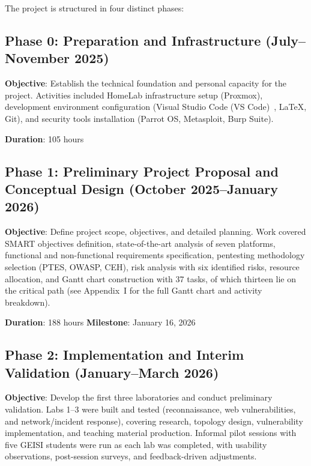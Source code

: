 The project is structured in four distinct phases:

\subsection{Phase 0: Preparation and Infrastructure (July--November 2025)}

\textbf{Objective}: Establish the technical foundation and personal capacity for the project.
Activities included HomeLab infrastructure setup (Proxmox\cite{proxmox}), development
environment configuration (Visual Studio Code (VS Code)~\cite{vscode}, LaTeX\cite{latex_project}, Git), and security tools
installation (Parrot OS\cite{parrot_os}, Metasploit\cite{metasploit}, Burp Suite\cite{burp_suite}).

\textbf{Duration}: 105 hours

\subsection{Phase 1: Preliminary Project Proposal and Conceptual Design (October 2025--January 2026)}

\textbf{Objective}: Define project scope, objectives, and detailed planning.
Work covered SMART objectives definition, state-of-the-art analysis of seven platforms,
functional and non-functional requirements specification, pentesting methodology selection
(PTES\cite{ptes}, OWASP\cite{owasp_testing_guide}, CEH\cite{ceh_framework}), risk analysis
with six identified risks, resource allocation, and Gantt chart construction with 37 tasks, of which thirteen lie on the critical path
(see Appendix~I for the full Gantt chart and activity breakdown).

\textbf{Duration}: 188 hours \quad \textbf{Milestone}: January 16, 2026

\subsection{Phase 2: Implementation and Interim Validation (January--March 2026)}

\textbf{Objective}: Develop the first three laboratories and conduct preliminary validation.
Labs 1--3 were built and tested (reconnaissance, web vulnerabilities, and network/incident
response), covering research, topology design, vulnerability implementation, and teaching
material production. Informal pilot sessions with five GEISI students were run as each
lab was completed, with usability observations, post-session surveys, and feedback-driven
adjustments.

